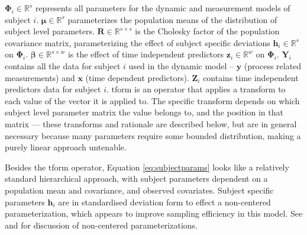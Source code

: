 \documentclass[nojss]{jss}\usepackage[]{graphicx}\usepackage[]{color}
\newcommand{\vect}[1]{\boldsymbol{\mathbf{#1}}}
\begin{document}
$\vect{\Phi}_i \in\mathbb{R}^{s}$ represents all parameters for the dynamic and measurement models of subject $i$. 
$\vect{\mu} \in\mathbb{R}^{s}$ parameterizes the population means of the distribution of subject level parameters. 
$\vect{R} \in\mathbb{R}^{s \times s}$ is the Cholesky factor of the population covariance matrix, parameterizing the effect of subject specific deviations $\vect{h}_i \in\mathbb{R}^{s}$ on $\vect{\Phi}_i$.
$\vect{\beta} \in\mathbb{R}^{s \times w}$ is the effect of time independent predictors $\vect{z}_i \in\mathbb{R}^{w}$  on $\vect{\Phi}_i$. 
$\vect{Y}_i$ contains all the data for subject $i$ used in the dynamic model -- $\vect{y}$ (process related measurements) and $\vect{x}$ (time dependent predictors).  $\vect{Z}_i$ contains time independent predictors data for subject $i$. 
$\text{tform}$ is an operator that applies a transform to each value of the vector it is applied to. The specific transform depends on which subject level parameter matrix the value belongs to, and the position in that matrix --- these transforms and rationale are described below, but are in general necessary because many parameters require some bounded distribution, making a purely linear approach untenable. 

Besides the $\text{tform}$ operator, Equation \ref{eq:subjectparams} looks like a relatively standard hierarchical approach, with subject parameters dependent on a population mean and covariance, and observed covariates. Subject specific parameters $\vect{h}_i$ are in standardised deviation form to effect a non-centered parameterization, which appears to improve sampling efficiency in this model. See \citet{bernardo2003noncentered} and \citet{betancourt2013hamiltonian} for discussion of non-centered parameterizations.
\end{document}
